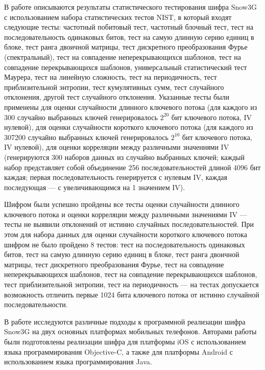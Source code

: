 \documentclass{./civarticle}
\begin{document}
В работе \cite{art2} описываются результаты статистического тестирования шифра Snow3G с использованием набора статистических тестов NIST, в который входят следующие тесты: частотный побитовый тест, частотный блочный тест, тест на последовательность одинаковых битов, тест на самую длинную серию единиц в блоке, тест ранга двоичной матрицы, тест дискретного преобразования Фурье (спектральный), тест на совпадение неперекрывающихся шаблонов, тест на совпадение перекрывающихся шаблонов, универсальный статистический тест Маурера, тест на линейную сложность, тест на периодичность, тест приблизительной энтропии, тест кумулятивных сумм, тест случайного отклонения, другой тест случайного отклонения. Указанные тесты были применены для оценки случайности длинного ключевого потока (для каждого из 300 случайно выбранных ключей генерировалось $2^{20}$ бит ключевого потока, IV нулевой), для оценки случайности короткого ключевого потока (для каждого из 307200 случайно выбранных ключей генерировалось $2^{10}$ бит ключевого потока, IV нулевой), для оценки корреляции между различными значениями IV (генерируются 300 наборов данных из случайно выбранных ключей; каждый набор представляет собой объединение 256 последовательностей длиной 4096 бит каждая; первая последовательность генерируется с нулевым IV, каждая последующая --- с увеличивающимся на 1 значением IV).

Шифром были успешно пройдены все тесты оценки случайности длинного ключевого потока и оценки корреляции между различными значениями IV --- тесты не выявили отклонений от истинно случайных последовательностей. При этом для набора данных для оценки случайности короткого ключевого потока шифром не было пройдено 8 тестов: тест на последовательность одинаковых битов, тест на самую длинную серию единиц в блоке, тест ранга двоичной матрицы, тест дискретного преобразования Фурье, тест на совпадение неперекрывающихся шаблонов, тест на совпадение перекрывающихся шаблонов, тест приблизительной энтропии, тест на периодичность --- на тестах допускается возможность отличить первые 1024 бита ключевого потока от истинно случайной последовательности.

В работе \cite{art1} исследуются различные подходы к программной реализации шифра Snow3G на двух основных платформах мобильных телефонов. Авторами работы были подготовлены реализации шифра для платформы iOS с использованием языка программирования Objective-C, а также для платформы Android с использованием языка программирования Java. 
\end{document}

